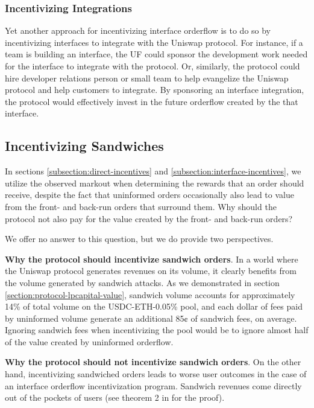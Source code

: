     \subsubsection{Incentivizing Integrations}
        Yet another approach for incentivizing interface orderflow is to do so by incentivizing interfaces to integrate with the Uniswap protocol. For instance, if a team is building an interface, the UF could sponsor the development work needed for the interface to integrate with the protocol. Or, similarly, the protocol could hire developer relations person or small team to help evangelize the Uniswap protocol and help customers to integrate. By sponsoring an interface integration, the protocol would effectively invest in the future orderflow created by the that interface.

\subsection{Incentivizing Sandwiches}
    In sections \ref{subsection:direct-incentives} and \ref{subsection:interface-incentives}, we utilize the observed markout when determining the rewards that an order should receive, despite the fact that uninformed orders occasionally also lead to value from the front- and back-run orders that surround them. Why should the protocol not also pay for the value created by the front- and back-run orders?

    We offer no answer to this question, but we do provide two perspectives.

    \textbf{Why the protocol should incentivize sandwich orders}.
    In a world where the Uniswap protocol generates revenues on its volume, it clearly benefits from the volume generated by sandwich attacks. As we demonstrated in section \ref{section:protocol-lpcapital-value}, sandwich volume accounts for approximately 14\% of total volume on the USDC-ETH-0.05\% pool, and each dollar of fees paid by uninformed volume generate an additional 85¢ of sandwich fees, on average. Ignoring sandwich fees when incentivizing the pool would be to ignore almost half of the value created by uninformed orderflow.

    \textbf{Why the protocol should not incentivize sandwich orders}.
    On the other hand, incentivizing sandwiched orders leads to worse user outcomes in the case of an interface orderflow incentivization program. Sandwich revenues come directly out of the pockets of users (see theorem 2 in \cite{heimbach2022eliminating} for the proof). 

